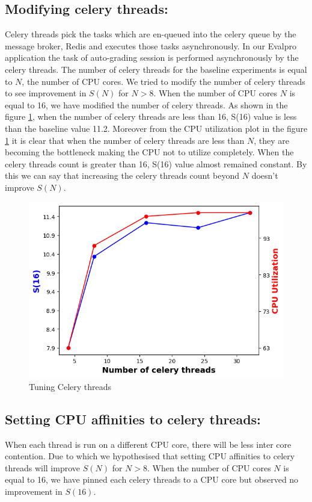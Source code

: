 \documentclass[sigconf]{acmart}
\begin{document}
\subsection{Modifying celery threads:}
Celery threads pick the tasks which are en-queued into the celery queue by the message broker, Redis and executes those tasks asynchronously. In our Evalpro application the task of auto-grading session is performed asynchronously by the celery threads. The number of celery threads for the baseline experiments is equal to $N$, the number of CPU cores. We tried to modify the number of celery threads to see improvement in $S(N)$ for $N>8$. When the number of CPU cores $N$ is equal to 16,  we have modified the number of celery threads. As shown in the figure \ref{celery_plot}, when the number of celery threads are less than 16, S(16) value is less than the baseline value 11.2. Moreover from the CPU utilization plot in the figure \ref{celery_plot} it is clear that when the number of celery threads are less than $N$, they are becoming the bottleneck making the CPU not to utilize completely. When the celery threads count is greater than 16, S(16) value almost remained constant. By this we can say that increasing the celery threads count beyond $N$ doesn't improve $S(N)$.
\begin{figure}[!htb]
  \centering
  \includegraphics[width=\linewidth]{Pictures/celery_threads.png}
  \caption{Tuning Celery threads}
  \label{celery_plot}
\end{figure}
\subsection{Setting CPU affinities to celery threads:}
When each thread is run on a different CPU core, there will be less inter core contention. Due to which we hypothesised that setting CPU affinities to celery threads will improve  $S(N)$ for $N>8$. When the number of CPU cores $N$ is equal to 16, we have pinned each celery threads to a CPU core but observed no improvement in $S(16)$.
\end{document}

